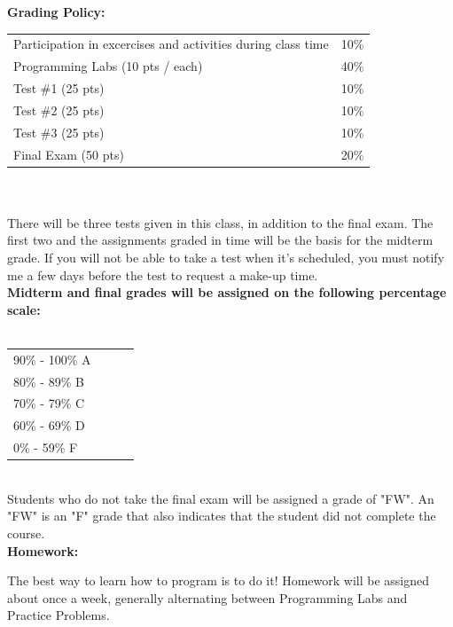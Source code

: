 \documentclass[11pt]{article}
\begin{document}
\textbf {\large Grading Policy:} \\
\hspace*{40mm}
\begin{tabular}{ l l }
Participation in excercises and activities during class time & 10\% \\
Programming Labs (10 pts / each)& 40\% \\
Test \#1 (25 pts) & 10\% \\
Test \#2 (25 pts) & 10\% \\
Test \#3  (25 pts) & 10\% \\
Final Exam  (50 pts)& 20\%
\end{tabular} \\\\

There will be three tests given in this class, in addition to the final exam.
The first two and the assignments graded in time will be the basis for the
midterm grade. If you will not be able to take a test when it's scheduled, you
must notify me a few days before the test to request a make-up time.\\

\textbf {\large Midterm and final grades will be assigned on the following percentage scale:} \\\\
\hspace*{40mm}
\begin{tabular}{ l l | l l }
90\% - 100\% A \\
80\% - 89\% B \\
70\% - 79\% C \\
60\% - 69\% D \\
0\% - 59\% F \\
\end{tabular} \\

Students who do not take the final exam will be assigned a grade of "FW". An "FW" is an "F" grade that also indicates that the student did not complete the course.\\


\textbf {\large Homework:}

The best way to learn how to program is to do it! Homework will be assigned
about once a week, generally alternating between Programming Labs and Practice
Problems.
\end{document}
